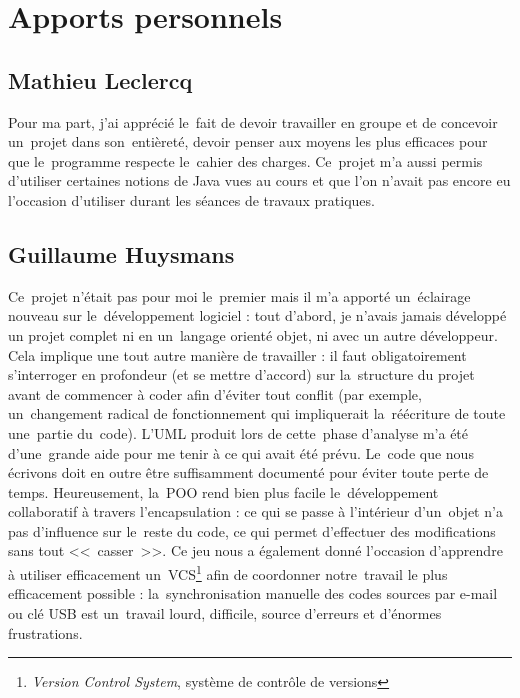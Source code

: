 \section{Apports personnels}

\subsection{Mathieu Leclercq}
Pour ma part, j'ai apprécié le~fait de devoir travailler en groupe et de concevoir un~projet dans son~entièreté,
devoir penser aux moyens les plus efficaces pour que le~programme respecte le~cahier des charges. 
Ce~projet m'a aussi permis d'utiliser certaines notions de Java vues au cours et que l'on n'avait pas encore eu 
l'occasion d'utiliser durant les séances de travaux pratiques.   

\subsection{Guillaume Huysmans}
Ce~projet n'était pas pour moi le~premier mais il m'a apporté un~éclairage nouveau sur le~développement logiciel : 
tout d'abord, je n'avais jamais développé un projet complet ni en un~langage orienté objet, ni avec un autre développeur. 
Cela implique une tout autre manière de travailler : il faut obligatoirement s'interroger en profondeur (et se mettre d'accord) 
sur la~structure du projet avant de commencer à coder afin d'éviter tout conflit (par exemple, un~changement radical 
de fonctionnement qui impliquerait la~réécriture de toute une~partie du~code). 
L'UML produit lors de cette~phase d'analyse m'a été d'une~grande aide pour me tenir à ce qui avait été prévu. 
Le~code que nous écrivons doit en outre être suffisamment documenté pour éviter toute perte de temps.
Heureusement, la~POO rend bien plus facile le~développement collaboratif à travers l'encapsulation : ce qui se passe à l'intérieur 
d'un~objet n'a pas d'influence sur le~reste du code, ce qui permet d'effectuer des modifications sans tout <<~casser~>>. 
Ce jeu nous a également donné l'occasion d'apprendre à utiliser efficacement 
un~VCS\footnote{\emph{Version Control System}, système de contrôle de versions} 
afin de coordonner notre~travail le plus efficacement possible : la~synchronisation manuelle des codes sources par e-mail ou 
clé USB est un~travail lourd, difficile, source d'erreurs et d'énormes frustrations.